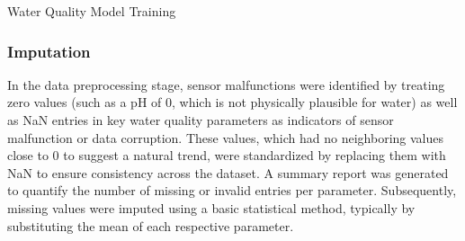\begin{algorithm}[H]
    \caption{Water Quality Model Training}
    
    \label{alg:model_training}
    
    
    
\end{algorithm}




\subsubsection{Imputation}
In the data preprocessing stage, sensor malfunctions were identified by treating zero values (such as a pH of 0, which is not physically plausible for water) as well as NaN entries in key water quality parameters as indicators of sensor malfunction or data corruption. These values, which had no neighboring values close to 0 to suggest a natural trend, were standardized by replacing them with NaN to ensure consistency across the dataset. A summary report was generated to quantify the number of missing or invalid entries per parameter. Subsequently, missing values were imputed using a basic statistical method, typically by substituting the mean of each respective parameter.

